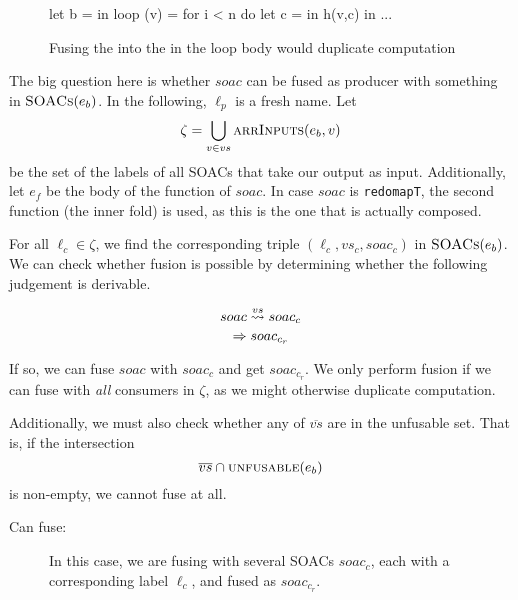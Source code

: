 \begin{description}[style=nextline]
\begin{figure}
\begin{center}
\begin{bcolorcode}
let b =  in
loop (v) = for i < n do
             let c =  in
             h(v,c) in
...
\end{bcolorcode}
\end{center}
\caption{Fusing the  into the  in the loop body would duplicate computation}
\label{fig:cannot-fuse-loop}
\end{figure}

\item[Case $e \equiv \texttt{let \{$\overline{vs}$\} = $soac$ in $e_{b}$}$]

  The big question here is whether $soac$ can be fused as producer
  with something in $\textsc{SOACs}(e_{b})$.  In the following, $\ell_{p}$ is
  a fresh name.  Let
  \[
  \zeta = \bigcup_{v \in vs} \textsc{arrInputs}(e_{b},v)
  \]
  be the set of the labels of all SOACs that take our output as input.
  Additionally, let $e_{f}$ be the body of the function of $soac$.  In
  case $soac$ is \texttt{redomapT}, the second function (the inner
  fold) is used, as this is the one that is actually composed.

  For all $\ell_{c} \in \zeta$, we find the corresponding triple
  $(\ell_{c},vs_{c},soac_{c})$ in $\textsc{SOACs}(e_{b})$.  We can check
  whether fusion is possible by determining whether the following
  judgement is derivable.

\[
   \fusesto
    {vs}
    {soac}
    {soac_{c}}
    {soac_{c_{r}}}
\]

If so, we can fuse $soac$ with $soac_{c}$ and get $soac_{c_{r}}$.  We
only perform fusion if we can fuse with \textit{all} consumers in
$\zeta$, as we might otherwise duplicate computation.

Additionally, we must also check whether any of $\overline{vs}$ are in
the unfusable set.  That is, if the intersection
\[
\overline{vs} \cap \textsc{unfusable}(e_{b})
\]
is non-empty, we cannot fuse at all.

\begin{description}
\item[Can fuse:]

  In this case, we are fusing with several SOACs $soac_{c}$, each with
  a corresponding label $\ell_{c}$, and fused as $soac_{c_{r}}$.


\end{description}
\end{description}

